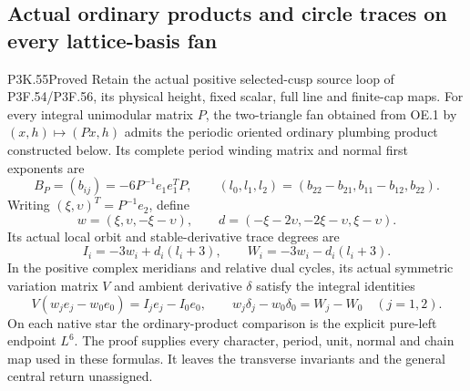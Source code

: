 \subsection{Actual ordinary products and circle traces on every lattice-basis fan}
\begin{statement}{P3K.55}{Proved}
Retain the actual positive selected-cusp source loop of P3F.54/P3F.56,
its physical height, fixed scalar, full line and finite-cap maps. For
every integral unimodular matrix \(P\), the two-triangle fan obtained
from OE.1 by \((x,h)\mapsto(Px,h)\) admits the periodic oriented
ordinary plumbing product constructed below. Its complete period
winding matrix and normal first exponents are
\[
 B_P=(b_{ij})=-6P^{-1}e_1e_1^TP,\qquad
 (l_0,l_1,l_2)=(b_{22}-b_{21},b_{11}-b_{12},b_{22}).
\]
Writing \((\xi,\upsilon)^T=P^{-1}e_2\), define
\[
 w=(\xi,\upsilon,-\xi-\upsilon),\qquad
 d=(-\xi-2\upsilon,-2\xi-\upsilon,\xi-\upsilon).
\]
Its actual local orbit and stable-derivative trace degrees are
\[
 I_i=-3w_i+d_i(l_i+3),\qquad W_i=-3w_i-d_i(l_i+3).
\]
In the positive complex meridians and relative dual cycles, its
actual symmetric variation matrix \(V\) and ambient derivative
\(\delta\) satisfy the integral identities
\[
 V(w_je_j-w_0e_0)=I_je_j-I_0e_0,\qquad
 w_j\delta_j-w_0\delta_0=W_j-W_0\quad(j=1,2).
\]
On each native star the ordinary-product comparison is the explicit
pure-left endpoint \(L^6\). The proof supplies every character,
period, unit, normal and chain map used in these formulas. It leaves
the transverse invariants and the general central return unassigned.
\end{statement}
